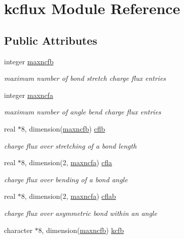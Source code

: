 \hypertarget{classkcflux}{\section{kcflux Module Reference}
\label{classkcflux}
}
\subsection*{Public Attributes}
\begin{DoxyCompactItemize}
\item 
integer \hyperlink{classkcflux_a46f26e9cd59b945af602a5b971d2ec86}{maxncfb}
\begin{DoxyCompactList}\small\item\em maximum number of bond stretch charge flux entries \end{DoxyCompactList}\item 
integer \hyperlink{classkcflux_aed5026e7c442e2d8adc07418913e4b23}{maxncfa}
\begin{DoxyCompactList}\small\item\em maximum number of angle bend charge flux entries \end{DoxyCompactList}\item 
real $\ast$8, dimension(\hyperlink{classkcflux_a46f26e9cd59b945af602a5b971d2ec86}{maxncfb}) \hyperlink{classkcflux_a4d5f1952541c88e9d14138a352e4ae77}{cflb}
\begin{DoxyCompactList}\small\item\em charge flux over stretching of a bond length \end{DoxyCompactList}\item 
real $\ast$8, dimension(2, \hyperlink{classkcflux_aed5026e7c442e2d8adc07418913e4b23}{maxncfa}) \hyperlink{classkcflux_a067a33e9e311bc7aa28ba929ba7b4798}{cfla}
\begin{DoxyCompactList}\small\item\em charge flux over bending of a bond angle \end{DoxyCompactList}\item 
real $\ast$8, dimension(2, \hyperlink{classkcflux_aed5026e7c442e2d8adc07418913e4b23}{maxncfa}) \hyperlink{classkcflux_ad9c316648b712054ed06b3a6e5b4fbd9}{cflab}
\begin{DoxyCompactList}\small\item\em charge flux over asymmetric bond within an angle \end{DoxyCompactList}\item 
character $\ast$8, dimension(\hyperlink{classkcflux_a46f26e9cd59b945af602a5b971d2ec86}{maxncfb}) \hyperlink{classkcflux_aaa22ec05a2e498ed74e13845c7f1fef7}{kcfb}

\end{DoxyCompactItemize}
